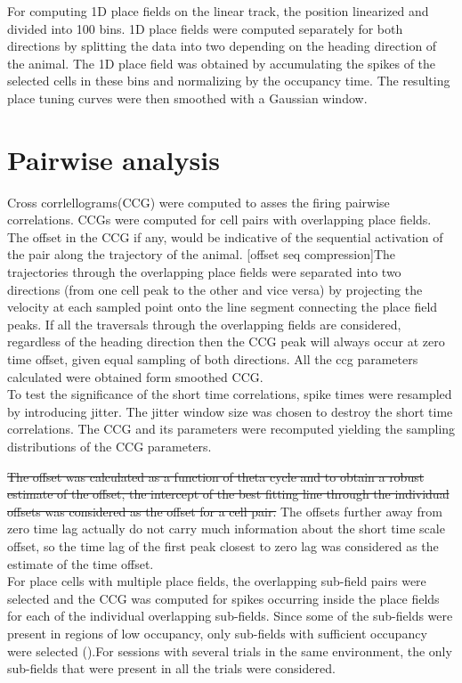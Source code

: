 For computing 1D place fields on the linear track, the position linearized and divided into 100 bins.
1D place fields were computed separately for both directions by splitting the data into two depending on the heading direction of the animal. The 1D place field was obtained by accumulating the spikes of the selected cells in these bins and normalizing by the occupancy  time. The resulting place tuning curves were then smoothed with a Gaussian window.\\

\section{Pairwise analysis}
Cross corrlellograms(CCG) were computed to asses the firing pairwise correlations. CCGs were computed for cell pairs with overlapping place fields. The offset in the CCG if any, would be indicative of the sequential activation of the pair along the trajectory of the animal. [offset seq compression]The trajectories through the overlapping place fields were separated into two directions (from one cell peak to the other and vice versa) by projecting the velocity at each sampled point onto the line segment connecting the place field peaks. If all the traversals through the overlapping fields are considered, regardless of the heading direction then the CCG peak will always occur at zero time offset, given equal sampling of both directions. All the ccg parameters calculated were obtained form smoothed CCG. \\
To test the significance of the short time correlations, spike times were resampled by introducing jitter. The jitter window size was chosen to destroy the short time correlations. The CCG and its parameters were recomputed yielding the sampling distributions of the CCG parameters.

\st{The offset was calculated as a function of theta cycle and to obtain a robust estimate of the offset, the intercept of the best fitting line through the individual offsets was considered as the offset for a cell pair.} 
The offsets further away from zero time lag actually do not carry much information about the short time scale offset, so the time lag of the first peak closest to zero lag was considered as the estimate of the time  offset. \\
For place cells with multiple place fields, the overlapping sub-field pairs were selected and the CCG was computed for spikes occurring inside the place fields for each of the individual overlapping sub-fields. Since some of the sub-fields were present in regions of low occupancy, only sub-fields with sufficient occupancy were selected ().For sessions with several trials in the same environment, the only sub-fields that were present in all the trials were considered. \\

